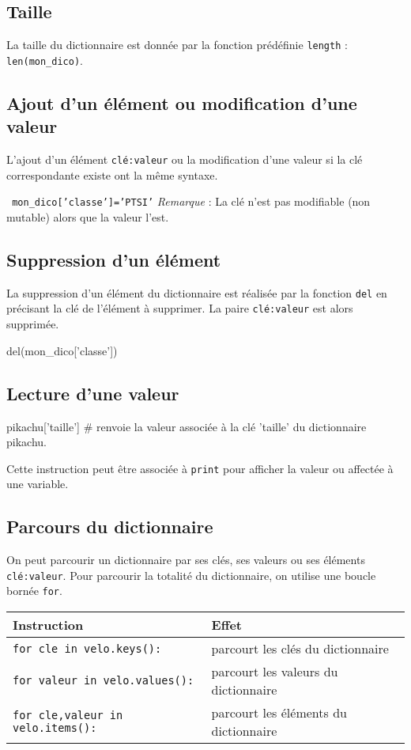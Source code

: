 \subsection*{Taille}
La taille du dictionnaire est donnée par la fonction prédéfinie \texttt{length} : 
\texttt{len(mon\_dico)}.


\subsection*{Ajout d'un élément ou modification d'une valeur}
L'ajout d'un élément \texttt{clé:valeur} ou la modification d'une valeur si la clé correspondante existe ont la même syntaxe.

\texttt{
mon\_dico['classe']='PTSI'}
\textit{Remarque} : La clé n'est pas modifiable (non mutable) alors que la valeur l'est.

\subsection*{Suppression d'un élément}
La suppression d'un élément du dictionnaire est réalisée par la fonction \texttt{del} en précisant la clé de l'élément à supprimer. La paire \texttt{clé:valeur} est alors supprimée.
\begin{python}
del(mon\_dico['classe'])
\end{python}

\subsection*{Lecture d'une valeur}

\begin{python}
pikachu['taille'] \# renvoie la valeur associée à la clé 'taille' du dictionnaire pikachu.
\end{python}
Cette instruction peut être associée à \texttt{print} pour afficher la valeur ou affectée à une variable.

\subsection*{Parcours du dictionnaire}
On peut parcourir un dictionnaire par ses clés, ses valeurs ou ses éléments \texttt{clé:valeur}. Pour parcourir la totalité du dictionnaire, on utilise une boucle bornée \texttt{for}.


\begin{center}
\begin{tabular}{|l|p{7cm}|}\hline Instruction & Effet \\
\hline
\texttt {for cle in velo.keys():} & parcourt les clés du dictionnaire\\
\hline
\texttt {for valeur in velo.values():} & parcourt les valeurs du dictionnaire\\
\hline
\texttt {for cle,valeur in velo.items():} & parcourt les éléments du dictionnaire\\
\hline
\end{tabular}
\end{center}


